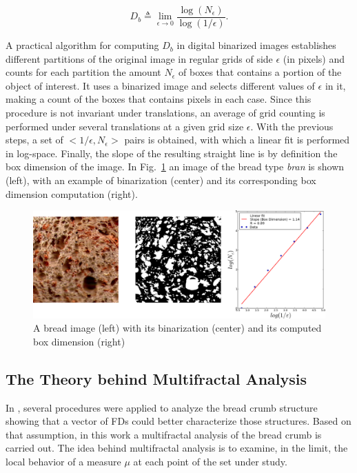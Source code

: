 \begin{equation}
D_{b} \triangleq \displaystyle\lim_{\epsilon \to 0}{\frac{\log(N_{\epsilon})}{\log (1/\epsilon)}}.
\label{eqn:1}
\end{equation}

A practical algorithm for computing $D_{b}$ in digital binarized images establishes different partitions of the original image in regular grids of side $\epsilon$ (in pixels) and counts for each partition the amount $N_{\epsilon}$ of boxes that contains a portion of the object of interest. It uses a binarized image and selects different values of $\epsilon$ in it, making a count of the boxes that contains pixels in each case. Since this procedure is not invariant under translations, an average of grid counting is performed under several translations at a given grid size $\epsilon$.­ With the previous steps, a set of $<1/\epsilon, N_\epsilon>$ pairs is obtained, with which a linear fit is performed in log-space. Finally, the slope of the resulting straight line is by definition the box dimension of the image. In Fig.~\ref{fig:fitbox} an image of the bread type {\em bran} is shown (left), with an example of binarization (center) and its corresponding box dimension computation (right).

\begin{figure}[htb]
\centering
\includegraphics[scale = 0.38]{../images/Fig1}
\caption{A bread image (left) with its binarization (center) and its computed box dimension (right)}
\label{fig:fitbox}
\end{figure}


\subsection{The Theory behind Multifractal Analysis}
\label{sec:4}

In \cite{Gonzales2008}, several procedures were applied to analyze the bread crumb structure showing that a vector of FDs could better characterize those structures. Based on that assumption, in this work a multifractal analysis of the bread crumb is carried out. The idea behind multifractal analysis is to examine, in the limit, the local behavior of a measure $\mu$ at each point of the set under study. 

